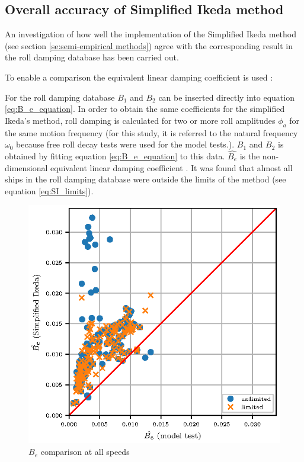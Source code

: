 \subsection{Overall accuracy of Simplified Ikeda method}
\label{se:overall_comparison}
An investigation of how well the implementation of the Simplified Ikeda method (see section \ref{se:semi-empirical methods}) agree with the corresponding result in the roll damping database has been carried out. 

To enable a comparison the equivalent linear damping coefficient is used \parencite{himeno_prediction_1981}:


For the roll damping database $B_1$ and $B_2$ can be inserted directly into equation  \ref{eq:B_e_equation}. 
In order to obtain the same coefficients for the simplified Ikeda's method, roll damping is calculated for two or more roll amplitudes $\phi_a$ for the same motion frequency (for this study, it is referred to the natural frequency $\omega_0$ because free roll decay tests were used for the model tests.). $B_1$ and $B_2$ is obtained by fitting equation \ref{eq:B_e_equation} to this data. $\hat{B_e}$ is the non-dimensional equivalent linear damping coefficient \parencite{himeno_prediction_1981}.
It was found that almost all ships in the roll damping database were outside the limits of the method (see equation \ref{eq:SI_limits}). 

\begin{figure}[H]
\centering
  \centering
  \includegraphics[width=1.0\columnwidth]{figures/ikeda_limited.eps}
  \caption{$\hat{B_e}$ comparison at all speeds}
  \label{fig:ikeda_limited}
\end{figure}


